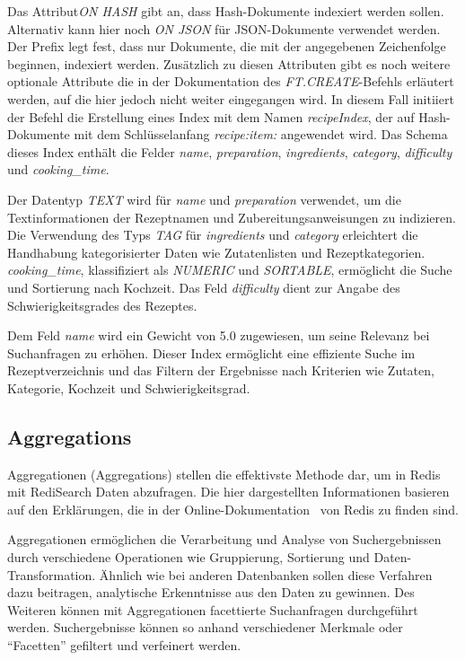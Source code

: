 Das Attribut\emph{ON HASH} gibt an, dass Hash-Dokumente indexiert werden sollen. Alternativ kann hier noch \emph{ON JSON} für JSON-Dokumente verwendet werden.
Der Prefix legt fest, dass nur Dokumente, die mit der angegebenen Zeichenfolge beginnen, indexiert werden. Zusätzlich zu diesen Attributen gibt es noch weitere optionale Attribute die in der Dokumentation des \emph{FT.CREATE}-Befehls erläutert werden, auf die hier jedoch nicht weiter eingegangen wird.
In diesem Fall initiiert der Befehl die Erstellung eines Index mit dem Namen \emph{recipeIndex}, der auf Hash-Dokumente mit dem Schlüsselanfang \emph{recipe:item:} angewendet wird. 
Das Schema dieses Index enthält die Felder \emph{name}, \emph{preparation}, \emph{ingredients}, \emph{category}, \emph{difficulty} und \emph{cooking\_time}.

Der Datentyp \emph{TEXT} wird für \emph{name} und \emph{preparation} verwendet, um die Textinformationen der Rezeptnamen und Zubereitungsanweisungen zu indizieren. Die Verwendung des Typs \emph{TAG} für \emph{ingredients} und \emph{category} erleichtert die Handhabung kategorisierter Daten wie Zutatenlisten und Rezeptkategorien. \emph{cooking\_time}, klassifiziert als \emph{NUMERIC} und \emph{SORTABLE}, ermöglicht die Suche und Sortierung nach Kochzeit. Das Feld \emph{difficulty} dient zur Angabe des Schwierigkeitsgrades des Rezeptes.

Dem Feld \emph{name} wird ein Gewicht von 5.0 zugewiesen, um seine Relevanz bei Suchanfragen zu erhöhen. Dieser Index ermöglicht eine effiziente Suche im Rezeptverzeichnis und das Filtern der Ergebnisse nach Kriterien wie Zutaten, Kategorie, Kochzeit und Schwierigkeitsgrad.

\subsection{Aggregations}
Aggregationen (Aggregations) stellen die effektivste Methode dar, um in Redis mit RediSearch Daten abzufragen. Die hier dargestellten Informationen basieren auf den Erklärungen, die in der Online-Dokumentation~\cite{redis_ltd_aggregations_nodate} von Redis zu finden sind.

Aggregationen ermöglichen die Verarbeitung und Analyse von Suchergebnissen durch verschiedene Operationen wie Gruppierung, Sortierung und Daten-Transformation. Ähnlich wie bei anderen Datenbanken sollen diese Verfahren dazu beitragen, analytische Erkenntnisse aus den Daten zu gewinnen. Des Weiteren können mit Aggregationen facettierte Suchanfragen durchgeführt werden. Suchergebnisse können so anhand verschiedener Merkmale oder \enquote{Facetten} gefiltert und verfeinert werden.

